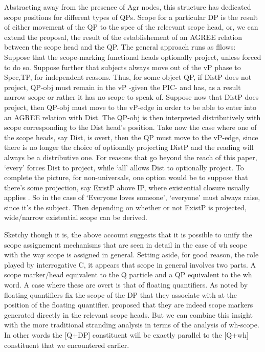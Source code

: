 \documentclass[11pt]{article}
\begin{document}
Abstracting away from the presence of Agr nodes, this structure has dedicated scope positions for different types of QPs.  Scope for a particular DP is the result of either movement of the QP to the spec of the releevant scope head, or, we can extend the proposal, the result of the establishement of an AGREE relation between the scope head and the QP.  The general approach runs as fllows:  Suppose that the scope-marking functional heads optionally project, unless forced to do so.  Suppose further that subjects always move out of the vP phase to Spec,TP, for independent reasons.
Thus, for some object QP, if DistP does not project, QP-obj must remain in the vP -given the  PIC- and has, as a result narrow scope or rather it has no scope to speak of. Suppose now that DistP does project, then QP-obj must move to the vP-edge in order to be able to enter into an AGREE relation with Dist. The QP-obj is then interpreted distributively with scope corresponding to the Dist head's position.
Take now the case where one of the scope heads, say Dist, is overt, then the QP must move to the vP-edge, since there is no longer the choice of optionally projecting DistP and the reading will always be a distributive one.  For reasons that go beyond the reach of this paper, `every' forces Dist to project, while `all' allows Dist to optionally project.
To complete the picture, for non-universals, one option would be to  suppose that there's some projection, say ExistP above IP, where existential closure usually applies \citet{kratzer:05}. So in the case of  `Everyone loves someone', `everyone' must always raise, since it's the subject. Then depending on whether or not ExistP is projected,  wide/narrow existential scope can be derived.

Sketchy though it is, the above account suggests that it is possible to unify the scope assignement mechanisms that are seen in detail in the case of wh scope with the way scope is assigned in general.  Setting aside, for good reason, the role played by interrogative C, it appears that scope in general involves two parts.  A scope marker/head equivalent to the Q particle and a QP equivalent to the wh word.  A case where these are overt is that of floating quantifiers.  As noted by \citet{dowty-brodie:84} floating quantifiers fix the scope of the DP that they associate with at the position of the floating quantifier.  \citet{tsoulas:03} proposed that they are indeed scope markers generated directly in the relevant scope heads.  But we can combine this insight with the more traditional stranding analysis in terms of the analysis of wh-scope.  In other words the [Q+DP] constituent will be exactly parallel to the [Q+wh] constituent that we encountered earlier.
\end{document}
